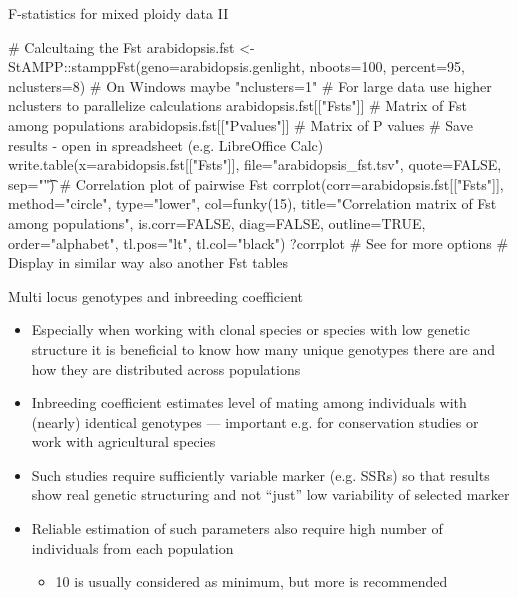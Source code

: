\documentclass[compress, xelatex, 11pt, xcolor=svgnames, aspectratio=169, url={hyphens, lowtilde}]{beamer}
\begin{document}
\begin{frame}[fragile]{F-statistics for mixed ploidy data II}
	\begin{spluscode}
    # Calcultaing the Fst
    arabidopsis.fst <- StAMPP::stamppFst(geno=arabidopsis.genlight,
      nboots=100, percent=95, nclusters=8) # On Windows maybe "nclusters=1"
    # For large data use higher nclusters to parallelize calculations
    arabidopsis.fst[["Fsts"]] # Matrix of Fst among populations
    arabidopsis.fst[["Pvalues"]] # Matrix of P values
    # Save results - open in spreadsheet (e.g. LibreOffice Calc)
    write.table(x=arabidopsis.fst[["Fsts"]], file="arabidopsis_fst.tsv",
      quote=FALSE, sep="\t")
    # Correlation plot of pairwise Fst
    corrplot(corr=arabidopsis.fst[["Fsts"]], method="circle", type="lower",
      col=funky(15), title="Correlation matrix of Fst among populations",
      is.corr=FALSE, diag=FALSE, outline=TRUE, order="alphabet", tl.pos="lt",
      tl.col="black")
    ?corrplot # See for more options
    # Display in similar way also another Fst tables
	\end{spluscode}
\end{frame}

\begin{frame}{Multi locus genotypes and inbreeding coefficient}
	\begin{itemize}
		\item Especially when working with clonal species or species with low genetic structure it is beneficial to know how many unique genotypes there are and how they are distributed across populations
		\item Inbreeding coefficient estimates level of mating among individuals with (nearly) identical genotypes --- important e.g. for conservation studies or work with agricultural species
		\item Such studies require sufficiently variable marker (e.g. SSRs) so that results show real genetic structuring and not \enquote{just} low variability of selected marker
		\item Reliable estimation of such parameters also require high number of individuals from each population
		\begin{itemize}
			\item 10 is usually considered as minimum, but more is recommended
		\end{itemize}
	\end{itemize}
\end{frame}
\end{document}
